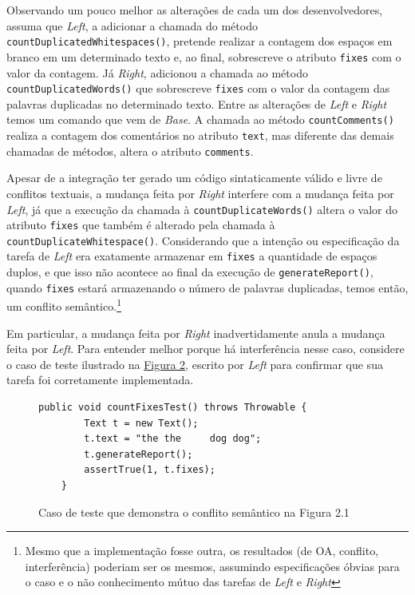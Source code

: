 Observando um pouco melhor as alterações de cada um dos desenvolvedores, assuma que \emph{Left}, a adicionar a chamada do método \texttt{countDuplicatedWhitespaces()}, pretende realizar a contagem dos espaços em branco em um determinado texto e, ao final, sobrescreve o atributo \texttt{fixes} com o valor da contagem. Já \emph{Right}, adicionou a chamada ao método \texttt{countDuplicatedWords()} que sobrescreve \texttt{fixes} com o valor da contagem das palavras duplicadas no determinado texto. Entre as alterações de \emph{Left} e \emph{Right} temos um comando que vem de \emph{Base}. A chamada ao método \texttt{countComments()} realiza a contagem dos comentários no atributo \texttt{text}, mas diferente das demais chamadas de métodos, altera o atributo \texttt{comments}.

Apesar de a integração ter gerado um código sintaticamente válido e livre de conflitos textuais, a mudança feita por \emph{Right} interfere com a mudança feita por \emph{Left}, já que a execução da chamada à \texttt{countDuplicateWords()} altera o valor do atributo \texttt{fixes} que também é alterado pela chamada à \texttt{countDuplicateWhitespace()}. Considerando que a intenção ou especificação da tarefa de \emph{Left} era exatamente armazenar em \texttt{fixes} a quantidade de espaços duplos, e que isso não acontece ao final da execução de \texttt{generateReport()}, quando \texttt{fixes} estará armazenando o número de palavras duplicadas, temos então, um conflito semântico.\footnote{Mesmo que a implementação fosse outra, os resultados (de OA, conflito, interferência) poderiam ser os mesmos, assumindo especificações óbvias para o caso e o não conhecimento mútuo das tarefas de \emph{Left} e \emph{Right}} 

Em particular, a mudança feita por \emph{Right} inadvertidamente anula a mudança feita por \emph{Left}.
Para entender melhor porque há interferência nesse caso, considere o caso de teste ilustrado na \hyperref[fig:teste-motivador]{Figura 2}, escrito por \emph{Left} para confirmar que sua tarefa foi corretamente implementada.

\begin{figure}[h]
    \begin{lstlisting}[]
    public void countFixesTest() throws Throwable {
        Text t = new Text();
        t.text = "the the     dog dog";
        t.generateReport();
        assertTrue(1, t.fixes);
    }
    \end{lstlisting}
    \caption{Caso de teste que demonstra o conflito semântico na Figura 2.1}
    \label{fig:teste-motivador}
\end{figure}

